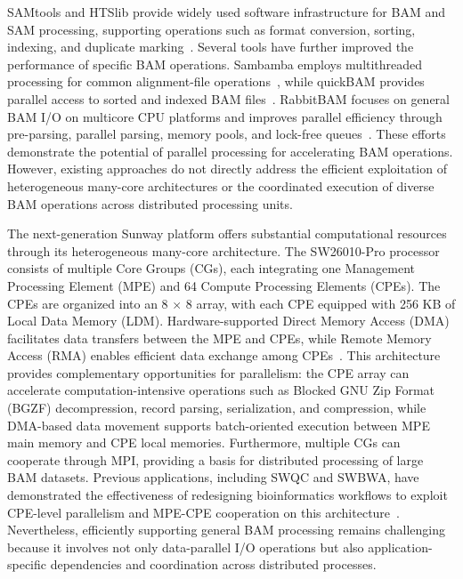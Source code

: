 \documentclass[lettersize,journal]{IEEEtran}
\begin{document}
SAMtools and HTSlib provide widely used software infrastructure for BAM and SAM processing, supporting operations such as format conversion, sorting, indexing, and duplicate marking~\cite{danecek2021samtools,bonfield2021htslib}. 
Several tools have further improved the performance of specific BAM operations. 
Sambamba employs multithreaded processing for common alignment-file operations~\cite{tarasov2015sambamba}, while quickBAM provides parallel access to sorted and indexed BAM files~\cite{pitman2023quickbam}. 
RabbitBAM focuses on general BAM I/O on multicore CPU platforms and improves parallel efficiency through pre-parsing, parallel parsing, memory pools, and lock-free queues~\cite{yan2025rabbitbam}. These efforts demonstrate the potential of parallel processing for accelerating BAM operations. 
However, existing approaches do not directly address the efficient exploitation of heterogeneous many-core architectures or the coordinated execution of diverse BAM operations across distributed processing units.

The next-generation Sunway platform offers substantial computational resources through its heterogeneous many-core architecture. 
The SW26010-Pro processor consists of multiple Core Groups (CGs), each integrating one Management Processing Element (MPE) and 64 Compute Processing Elements (CPEs). 
The CPEs are organized into an 8 $\times$ 8 array, with each CPE equipped with 256 KB of Local Data Memory (LDM). 
Hardware-supported Direct Memory Access (DMA) facilitates data transfers between the MPE and CPEs, while Remote Memory Access (RMA) enables efficient data exchange among CPEs~\cite{zhu2021sunway}. 
This architecture provides complementary opportunities for parallelism: the CPE array can accelerate computation-intensive operations such as Blocked GNU Zip Format (BGZF) decompression, record parsing, serialization, and compression, while DMA-based data movement supports batch-oriented execution between MPE main memory and CPE local memories. 
Furthermore, multiple CGs can cooperate through MPI, providing a basis for distributed processing of large BAM datasets. 
Previous applications, including SWQC and SWBWA, have demonstrated the effectiveness of redesigning bioinformatics workflows to exploit CPE-level parallelism and MPE-CPE cooperation on this architecture~\cite{yan2025swqc,yan2026swbwa}. 
Nevertheless, efficiently supporting general BAM processing remains challenging because it involves not only data-parallel I/O operations but also application-specific dependencies and coordination across distributed processes.
\end{document}

